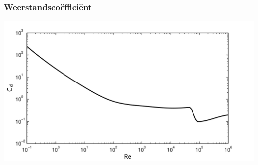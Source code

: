 \documentclass[t]{beamer}
\begin{document}
  	\begin{frame}
  		\frametitle{Weerstandscoëfficiënt}
  		\center
  		\includegraphics[width=\textwidth]{fig/uitwendige_stroming/Cilinderstroming_Cd}
  	\end{frame}
\end{document}
